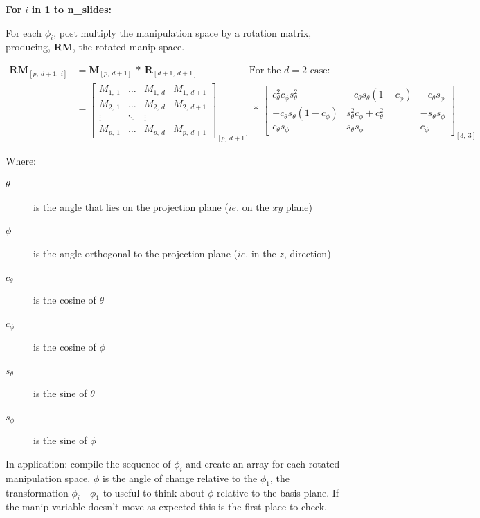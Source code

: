\documentclass{monashthesis}
\begin{document}
\textbf{For } \(i\) \textbf{in 1 to n\_slides:}

For each \(\phi_i\), post multiply the manipulation space by a rotation
matrix, producing, \textbf{RM}, the rotated manip space.

\begin{align*}
  \textbf{RM}_{[p,~d+1,~i]}
  &= \textbf{M}_{[p,~d+1]} ~*~ \textbf{R}_{[d+1,~d+1]}
    ~~~~~~~~~~~~~~~~~~~~~~~~\text{For the $d=2$ case:} \\
  &= \begin{bmatrix}
    M_{1,~1} & \dots & M_{1,~d} & M_{1,~d+1} \\
    M_{2,~1} & \dots & M_{2,~d} & M_{2,~d+1} \\
    \vdots   & \ddots& \vdots   \\
    M_{p,~1} & \dots & M_{p,~d} & M_{p,~d+1}
  \end{bmatrix}_{[p,~d+1]}
    ~*~
  \begin{bmatrix}
    c_\theta^2 c_\phi s_\theta^2 &
    -c_\theta s_\theta (1 - c_\phi) &
    -c_\theta s_\phi \\
    -c_\theta s_\theta (1 - c_\phi) &
    s_\theta^2 c_\phi + c_\theta^2 &
    -s_\theta s_\phi \\
    c_\theta s_\phi &
    s_\theta s_\phi &
    c_\phi
  \end{bmatrix}_{[3,~3]}
\end{align*}

Where:

\begin{description}
  \item[$\theta$] is the angle that lies on the projection plane ($ie.$ on the $xy$ plane)
  \item[$\phi$] is the angle orthogonal to the projection plane ($ie.$ in the $z$, direction)
  \item[$c_\theta$] is the cosine of $\theta$
  \item[$c_\phi$]   is the cosine of $\phi$
  \item[$s_\theta$] is the sine of   $\theta$
  \item[$s_\phi$]   is the sine of   $\phi$
\end{description}

In application: compile the sequence of \(\phi_i\) and create an array
for each rotated manipulation space. \(\phi\) is the angle of change
relative to the \(\phi_1\), the transformation \(\phi_i\) - \(\phi_1\)
to useful to think about \(\phi\) relative to the basis plane. If the
manip variable doesn't move as expected this is the first place to
check.
\end{document}
